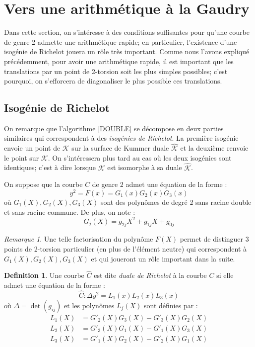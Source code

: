 \documentclass[a4paper]{article}
\theoremstyle{definition}
\newtheorem{definition}{Definition}[section]
\theoremstyle{remark}
\newtheorem{remarque}{Remarque}
\numberwithin{equation}{section}
\begin{document}
\section{Vers une arithmétique à la Gaudry}

Dans cette section, on s'intéresse à des conditions suffisantes pour qu'une courbe de genre 2 admette une arithmétique rapide; en particulier, l'existence d'une isogénie de Richelot jouera un rôle très important. Comme nous l'avons expliqué précédemment, pour avoir une arithmétique rapide, il est important que les translations par un point de 2-torsion soit les plus simples possibles; c'est pourquoi, on s'efforcera de diagonaliser le plus possible ces translations.

\subsection{Isogénie de Richelot}

On remarque que l'algorithme \ref{DOUBLE} se décompose en deux parties similaires qui correspondent à des \emph{isogénies de Richelot}. La première isogénie envoie un point de $\mathcal{K}$ sur la surface de Kummer duale $\hat{\mathcal{K}}$ et la deuxième renvoie le point sur $\mathcal{K}$. On s'intéressera plus tard au cas où les deux isogénies sont identiques; c'est à dire lorsque $\mathcal{K}$ est isomorphe à sa duale $\hat{\mathcal{K}}$.

On suppose que la courbe $C$ de genre 2 admet une équation de la forme :
$$y^2 = F(x) = G_1(x)G_2(x)G_3(x)$$
où $G_1(X),G_2(X),G_3(X)$ sont des polynômes de degré 2 sans racine double et sans racine commune. De plus, on note :
$$G_j(X) = g_{2j}X^2 + g_{1j}X + g_{0j}$$

\begin{remarque}
Une telle factorisation du polynôme $F(X)$ permet de distinguer 3 points de 2-torsion particulier (en plus de l'élément neutre) qui correspondent à $G_1(X),G_2(X),G_3(X)$ et qui joueront un rôle important dans la suite.
\end{remarque}

\begin{definition}
Une courbe $\hat{C}$ est dite \emph{duale de Richelot} à la courbe $C$ si elle admet une équation de la forme :
$$\hat{C} : \Delta y^2 = L_1(x)L_2(x)L_3(x)$$
où $\Delta = \det(g_{ij})$ et les polynômes $L_j(X)$ sont définies par :
\begin{align*}
L_1(X) &= G'_2(X)G_3(X) - G'_3(X)G_2(X) \\
L_2(X) &= G'_3(X)G_1(X) - G'_1(X)G_3(X) \\
L_3(X) &= G'_1(X)G_2(X) - G'_2(X)G_1(X)
\end{align*}
\end{definition}
\end{document}
